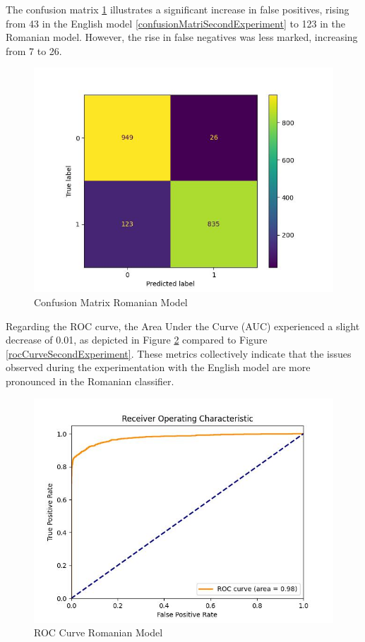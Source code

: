 \documentclass[3p,times,procedia]{elsarticle}
\begin{document}
The confusion matrix \ref{confusionMatrixRomanianExperiment} illustrates a significant increase in false positives, rising from 43 in the English model \ref{confusionMatriSecondExperiment} to 123 in the Romanian model. However, the rise in false negatives was less marked, increasing from 7 to 26.

\begin{figure}[htbp]
	\centering
		\includegraphics[scale=0.8]{./figures/metrics/experimentRomanian/confusionMatrix.jpg}
	\caption{Confusion Matrix Romanian Model}
	\label{confusionMatrixRomanianExperiment}
\end{figure}

Regarding the ROC curve, the Area Under the Curve (AUC) experienced a slight decrease of 0.01, as depicted in Figure \ref{rocCurveRomanianExperiment} compared to Figure \ref{rocCurveSecondExperiment}. These metrics collectively indicate that the issues observed during the experimentation with the English model are more pronounced in the Romanian classifier.

\begin{figure}[htbp]
	\centering
		\includegraphics[scale=0.8]{./figures/metrics/experimentRomanian/roc_curve.jpg}
	\caption{ROC Curve Romanian Model}
	\label{rocCurveRomanianExperiment}
\end{figure}
\end{document}

